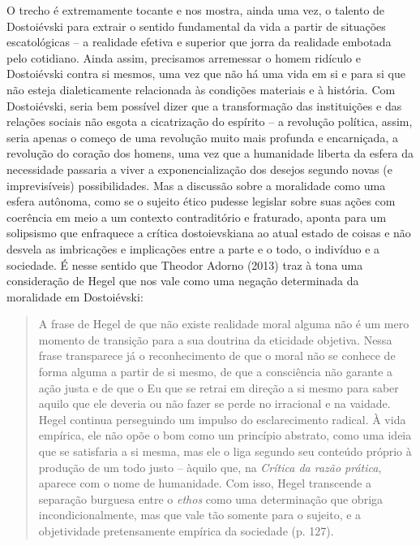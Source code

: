 O trecho é extremamente tocante e nos mostra, ainda uma vez, o talento
de Dostoiévski para extrair o sentido fundamental da vida a partir de
situações escatológicas -- a realidade efetiva e superior que jorra da
realidade embotada pelo cotidiano. Ainda assim, precisamos arremessar o
homem ridículo e Dostoiévski contra si mesmos, uma vez que não há uma
vida em si e para si que não esteja dialeticamente relacionada às
condições materiais e à história. Com Dostoiévski, seria bem possível
dizer que a transformação das instituições e das relações sociais não
esgota a cicatrização do espírito -- a revolução política, assim, seria
apenas o começo de uma revolução muito mais profunda e encarniçada, a
revolução do coração dos homens, uma vez que a humanidade liberta da
esfera da necessidade passaria a viver a exponencialização dos desejos
segundo novas (e imprevisíveis) possibilidades. Mas a discussão sobre a
moralidade como uma esfera autônoma, como se o sujeito ético pudesse
legislar sobre suas ações com coerência em meio a um contexto
contraditório e fraturado, aponta para um solipsismo que enfraquece a
crítica dostoievskiana ao atual estado de coisas e não desvela as
imbricações e implicações entre a parte e o todo, o indivíduo e a
sociedade. É nesse sentido que Theodor Adorno (2013) traz à tona uma
consideração de Hegel que nos vale como uma negação determinada da
moralidade em Dostoiévski:

\begin{quote}
A frase de Hegel de que não existe realidade moral alguma não é um mero
momento de transição para a sua doutrina da eticidade objetiva. Nessa
frase transparece já o reconhecimento de que o moral não se conhece de
forma alguma a partir de si mesmo, de que a consciência não garante a
ação justa e de que o Eu que se retrai em direção a si mesmo para saber
aquilo que ele deveria ou não fazer se perde no irracional e na vaidade.
Hegel continua perseguindo um impulso do esclarecimento radical. À vida
empírica, ele não opõe o bom como um princípio abstrato, como uma ideia
que se satisfaria a si mesma, mas ele o liga segundo seu conteúdo
próprio à produção de um todo justo -- àquilo que, na \emph{Crítica da
razão prática}, aparece com o nome de humanidade. Com isso, Hegel
transcende a separação burguesa entre o \emph{ethos} como uma
determinação que obriga incondicionalmente, mas que vale tão somente
para o sujeito, e a objetividade pretensamente empírica da sociedade (p.
127).
\end{quote}

